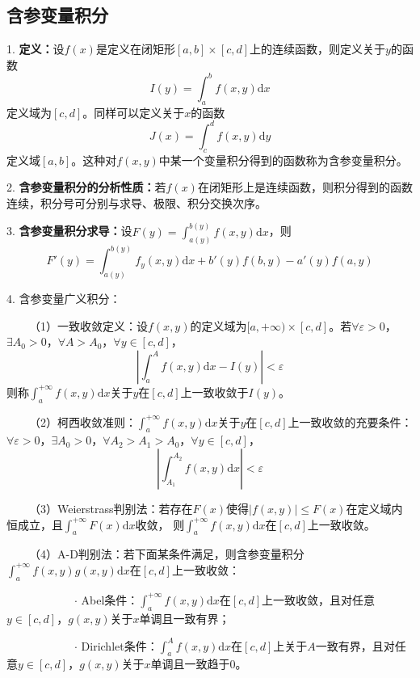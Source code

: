 \subsection{含参变量积分}

1. \textbf{定义：}设$f(x)$是定义在闭矩形$[a,b]\times [c,d]$上的连续函数，则定义关于$y$的函数
\begin{equation*}
    I(y)=\int_a^b f(x,y)\mathrm{d}x
\end{equation*}
定义域为$[c,d]$。同样可以定义关于$x$的函数
\begin{equation*}
    J(x)=\int_c^d f(x,y)\mathrm{d}y
\end{equation*}
定义域$[a,b]$。这种对$f(x,y)$中某一个变量积分得到的函数称为含参变量积分。

2. \textbf{含参变量积分的分析性质：}若$f(x)$在闭矩形上是连续函数，则积分得到的函数连续，积分号可分别与求导、极限、积分交换次序。

3. \textbf{含参变量积分求导：}设$F(y)=\int_{a(y)}^{b(y)}f(x,y)\mathrm{d}x$，则
\begin{equation*}
    F'(y)=\int_{a(y)}^{b(y)}f_y(x,y)\mathrm{d}x+b'(y)f(b,y)-a'(y)f(a,y)
\end{equation*}

4. 含参变量广义积分：

~~~~（1）一致收敛定义：设$f(x,y)$的定义域为$[a,+\infty)\times[c,d]$。若$\forall \varepsilon>0$，$\exists A_0>0$，$\forall A>A_0$，$\forall y\in [c,d]$， 
\begin{equation*}
    \left|\int_a^A f(x,y)\mathrm{d} x-I(y)\right|<\varepsilon
\end{equation*}
则称$\int_a^{+\infty} f(x,y)\mathrm{d}x$关于$y$在$[c,d]$上一致收敛于$I(y)$。

~~~~（2）柯西收敛准则：$\int_a^{+\infty} f(x,y)\mathrm{d}x$关于$y$在$[c,d]$上一致收敛的充要条件：$\forall \varepsilon>0$，$\exists A_0>0$，$\forall A_2>A_1>A_0$，$\forall y\in[c,d]$，
\begin{equation*}
    \left|\int_{A_1}^{A_2}f(x,y)\mathrm{d}x\right|<\varepsilon
\end{equation*}

~~~~（3）Weierstrass判别法：若存在$F(x)$使得$|f(x,y)|\leqslant F(x)$在定义域内恒成立，且$\int_a^{+\infty}F(x)\mathrm{d}x$收敛，
则$\int_a^{+\infty} f(x,y)\mathrm{d}x$在$[c,d]$上一致收敛。

~~~~（4）A-D判别法：若下面某条件满足，则含参变量积分$\int_a^{+\infty}f(x,y)g(x,y)\mathrm{d}x$在$[c,d]$上一致收敛：

~~~~~~~~~~~~$\cdot$ Abel条件：$\int_a^{+\infty}f(x,y)\mathrm{d}x$在$[c,d]$上一致收敛，且对任意$y\in [c,d]$，$g(x,y)$关于$x$单调且一致有界；

~~~~~~~~~~~~$\cdot$ Dirichlet条件：$\int_a^{A}f(x,y)\mathrm{d}x$在$[c,d]$上关于$A$一致有界，且对任意$y \in [c,d]$，$g(x,y)$关于$x$单调且一致趋于$0$。
